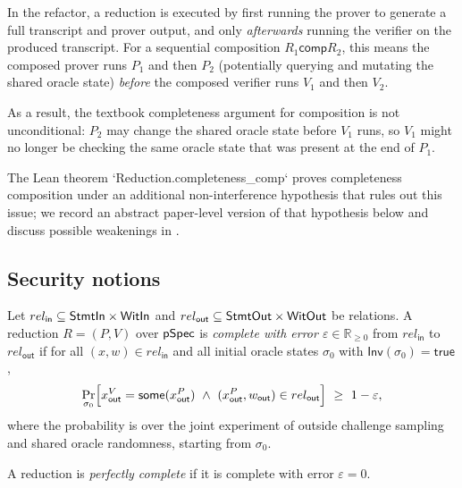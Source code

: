 \begin{remark}
\label{rem:composition_noninterference}
In the refactor, a reduction is executed by first running the prover to generate a full transcript
and prover output, and only \emph{afterwards} running the verifier on the produced transcript. For a
sequential composition $R_1 \mathbin{\mathsf{comp}} R_2$, this means the composed prover runs $P_1$
and then $P_2$ (potentially querying and mutating the shared oracle state) \emph{before} the composed
verifier runs $V_1$ and then $V_2$.

As a result, the textbook completeness argument for composition is not unconditional: $P_2$ may
change the shared oracle state before $V_1$ runs, so $V_1$ might no longer be checking the same
oracle state that was present at the end of $P_1$.

The Lean theorem `Reduction.completeness_comp` proves completeness composition under an additional
non-interference hypothesis that rules out this issue; we record an abstract paper-level version of
that hypothesis below and discuss possible weakenings in
.
\end{remark}

\subsection{Security notions}

\begin{definition}[Completeness]
Let $rel_{\mathsf{in}} \subseteq \mathsf{StmtIn}\times\mathsf{WitIn}$ and $rel_{\mathsf{out}} \subseteq
\mathsf{StmtOut}\times\mathsf{WitOut}$ be relations. A reduction $R=(P,V)$ over $\mathsf{pSpec}$ is \emph{complete with error
$\varepsilon \in \mathbb{R}_{\ge 0}$} from $rel_{\mathsf{in}}$ to $rel_{\mathsf{out}}$ if for all
$(x,w) \in rel_{\mathsf{in}}$ and all initial oracle states $\sigma_0$ with $\mathsf{Inv}(\sigma_0)=\mathsf{true}$,
\[
  \Pr_{\sigma_0}\Bigl[
    x^V_{\mathsf{out}} = \mathsf{some}(x^P_{\mathsf{out}})
    \ \wedge\ (x^P_{\mathsf{out}}, w_{\mathsf{out}}) \in rel_{\mathsf{out}}
  \Bigr] \ \ge\ 1-\varepsilon,
\]
where the probability is over the joint experiment of outside challenge sampling and shared oracle
randomness, starting from $\sigma_0$.
\end{definition}

\begin{definition}
A reduction is \emph{perfectly complete} if it is complete with error $\varepsilon = 0$.
\end{definition}

